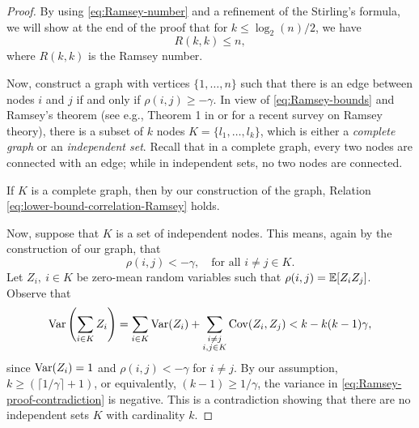 \begin{proof}%
By using \eqref{eq:Ramsey-number} and a refinement of the Stirling's formula, 
we will show at the end of the proof that for $k \le \log_2({n})/2$, we have 
\begin{equation}\label{eq:Ramsey-bounds}
 R(k,k) \le n,
\end{equation}
where $R(k,k)$ is the Ramsey number.  

Now, construct a graph with vertices $\{1,\dots,n\}$ such that there is an edge between nodes $i$ and $j$ if and only if $\rho(i,j) \ge -\gamma$. 
In view of \eqref{eq:Ramsey-bounds} and Ramsey's theorem (see e.g., Theorem 1 in \cite{fox2009lecture} or \cite{conlon2015recent} for a recent survey on Ramsey theory), there is a subset of $k$ nodes $K =\{l_1,\dots,l_k\}$, which is either a {\em complete graph} or an {\em independent set}.  Recall that in a
complete graph, every two nodes are connected with an edge; while in independent sets, no two nodes are connected.

If $K$ is a complete graph, then by our construction of the graph, Relation \eqref{eq:lower-bound-correlation-Ramsey} holds. 

Now, suppose that $K$ is a set of independent nodes.  This means, again by the construction of our graph, that
$$
\rho(i,j) < -\gamma,\quad\mbox{for all }i\not= j\in K.
$$
Let $Z_i,\ i \in K$ be zero-mean random variables such that 
$\rho(i,j) = {\mathbb E} [Z_iZ_j]$. Observe that
\begin{equation} \label{eq:Ramsey-proof-contradiction}
    {\rm {Var}}\left( \sum_{i\in K} Z_i\right) 
    = \sum_{i\in K} {\rm {Var}}(Z_i) + \sum_{\substack{i\not=j\\i,j \in K}} {\rm {Cov}}(Z_i, Z_j) 
    <  k - k(k-1)\gamma,
\end{equation}
since ${\rm {Var}}(Z_i)=1$ and $\rho(i,j)<-\gamma$ for $i\neq j$.
By our assumption, $k\ge \left(\lceil 1/\gamma \rceil + 1\right)$, or equivalently, $(k-1) \ge 1/\gamma$, the variance in \eqref{eq:Ramsey-proof-contradiction} is negative. 
This is a contradiction showing that there are no independent sets $K$ with cardinality $k$.


\end{proof}

